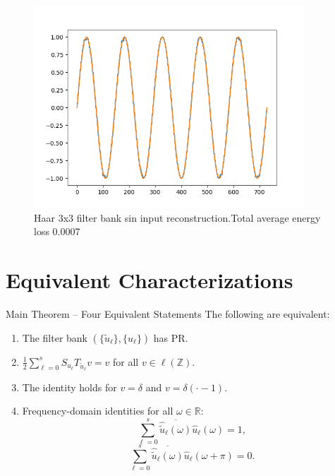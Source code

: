 \documentclass{beamer}
\begin{document}
\begin{frame}
\begin{itemize}
\begin{figure}[ht!]
\begin{minipage}{0.45\textwidth}
                      \includegraphics[width=0.9\textwidth]{fig/Haar3Augmented1D_sin_rec.png} %
                      \caption{Haar 3x3 filter bank sin input reconstruction.Total average energy loss 0.0007}
                  \end{minipage}
              \end{figure}
    \end{itemize}
\end{frame}

\section{Equivalent Characterizations}

\begin{frame}{Main Theorem -- Four Equivalent Statements}
    The following are equivalent:

    \begin{enumerate}
        \item The filter bank $(\{\tilde u_\ell\},\{u_\ell\})$ has PR.
        \item $\displaystyle\frac12\sum_{\ell=0}^{s} S_{u_\ell}T_{\tilde u_\ell}v = v$ for all $v\in\ell(\mathbb{Z})$.
        \item The identity holds for $v=\delta$ and $v=\delta(\cdot-1)$.
        \item Frequency-domain identities for all $\omega\in\mathbb{R}$:
              \[
                  \sum_{\ell=0}^{s}\overline{\hat{\tilde u}_\ell(\omega)}\hat u_\ell(\omega)=1,
              \]
              \[
                  \sum_{\ell=0}^{s}\overline{\hat{\tilde u}_\ell(\omega)}\hat u_\ell(\omega+\pi)=0.
              \]
    \end{enumerate}
\end{frame}
\end{document}
